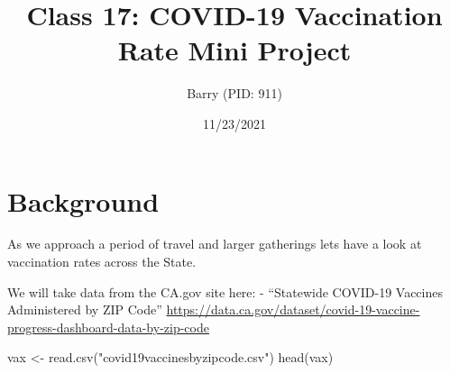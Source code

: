 \documentclass[
]{article}
\title{Class 17: COVID-19 Vaccination Rate Mini Project}
\author{Barry (PID: 911)}
\date{11/23/2021}
\newenvironment{Shaded}{\begin{snugshade}}{\end{snugshade}}
\newcommand{\FunctionTok}[1]{\textcolor[rgb]{0.00,0.00,0.00}{#1}}
\newcommand{\NormalTok}[1]{#1}
\newcommand{\OtherTok}[1]{\textcolor[rgb]{0.56,0.35,0.01}{#1}}
\newcommand{\StringTok}[1]{\textcolor[rgb]{0.31,0.60,0.02}{#1}}
\begin{document}
\maketitle

\hypertarget{background}{%
\section{Background}\label{background}}

As we approach a period of travel and larger gatherings lets have a look
at vaccination rates across the State.

We will take data from the CA.gov site here: - ``Statewide COVID-19
Vaccines Administered by ZIP Code''
\url{https://data.ca.gov/dataset/covid-19-vaccine-progress-dashboard-data-by-zip-code}

\begin{Shaded}
\begin{Highlighting}[]
\NormalTok{vax }\OtherTok{\textless{}{-}} \FunctionTok{read.csv}\NormalTok{(}\StringTok{"covid19vaccinesbyzipcode.csv"}\NormalTok{)}
\FunctionTok{head}\NormalTok{(vax)}
\end{Highlighting}
\end{Shaded}
\end{document}
